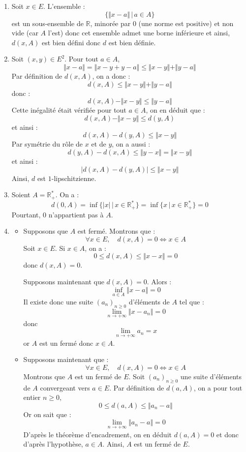\documentclass[a4paper,10pt]{report}
\begin{document}
\corr 

\begin{enumerate}
\item Soit $x \in E$. L'ensemble :
$$ \lbrace \Vert x- a \Vert \, \vert \, a \in A \rbrace$$
est un sous-ensemble de $\mathbb{R}$, minorée par $0$ (une norme est positive) et non vide (car $A$ l'est) donc cet ensemble admet une borne inférieure et ainsi, $d(x,A)$ est bien défini donc $d$ est bien définie.
\item Soit $(x,y) \in E^2$. Pour tout $a \in A$,
$$ \Vert x-a \Vert = \Vert x-y+y-a \Vert \leq \Vert x-y \Vert + \Vert y-a \Vert$$
Par définition de $d(x,A)$, on a donc :
$$ d(x,A) \leq \Vert x-y \Vert + \Vert y-a \Vert$$
donc :
$$ d(x,A) - \Vert x-y \Vert \leq \Vert y-a \Vert$$
Cette inégalité était vérifiée pour tout $a \in A$, on en déduit que :
$$ d(x,A) - \Vert x-y \Vert \leq d(y,A)$$
et ainsi :
$$ d(x,A)-d(y,A) \leq \Vert x-y \Vert$$
Par symétrie du rôle de $x$ et de $y$, on a aussi :
$$  d(y,A)-d(x,A) \leq \Vert y-x \Vert = \Vert x-y \Vert$$
et ainsi :
$$ \vert d(x,A)-d(y,A) \vert \leq \Vert x-y \Vert$$
Ainsi, $d$ est $1$-lipschitzienne.
\item Soient $A= \mathbb{R}_+^{*}$. On a :
$$ d(0,A) = \inf \lbrace \vert x \vert \, \vert \, x \in \mathbb{R}_+^* \rbrace = \inf \lbrace x \, \vert \, x \in \mathbb{R}_+^* \rbrace = 0$$
Pourtant, $0$ n'appartient pas à $A$.
\item 

\begin{itemize}
\item Supposons que $A$ est fermé. Montrons que :
$$ \forall x \in E, \quad d(x,A)=0 \Longleftrightarrow x \in A $$
Soit $x \in E$. Si $x \in A$, on a :
$$ 0 \leq d(x,A) \leq \Vert x-x\Vert = 0$$
donc $d(x,A)=0$.

\medskip

\noindent Supposons maintenant que $d(x,A)=0$. Alors :
$$ \inf_{a \in A} \Vert x- a \Vert = 0$$
Il existe donc une suite $(a_n)_{n \geq 0}$ d'éléments de $A$ tel que :
$$ \lim_{n \rightarrow + \infty} \Vert x-a_n \Vert = 0$$
donc 
$$ \lim_{n \rightarrow + \infty} a_n = x$$
or $A$ est un fermé donc $x\in A$.
\item Supposons maintenant que :
$$  \forall x \in E, \quad d(x,A)=0 \Longleftrightarrow x \in A $$
Montrons que $A$ est un fermé de $E$. Soit $(a_n)_{n \geq 0}$ une suite d'éléments de $A$ convergeant vers $a \in E$. Par définition de $d(a,A)$, on a pour tout entier $n \geq 0$,
$$0 \leq d(a,A) \leq \Vert a_n -a \Vert$$
Or on sait que :
$$ \lim_{n \rightarrow + \infty} \Vert a_n -a \Vert = 0$$
D'après le théorème d'encadrement, on en déduit $d(a,A)=0$ et donc d'après l'hypothèse, $a \in A$. Ainsi, $A$ est un fermé de $E$.
\end{itemize}
\end{enumerate}
\end{document}
